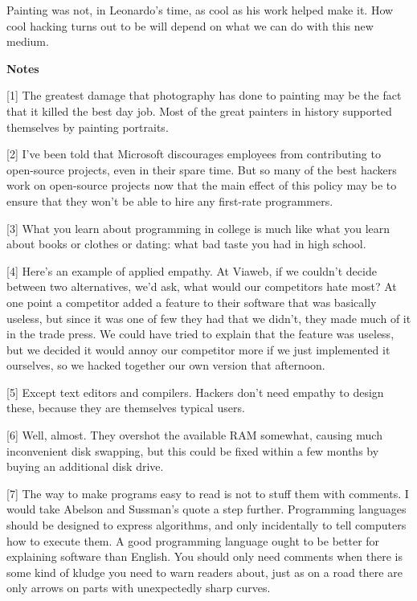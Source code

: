 Painting was not, in Leonardo's time, as cool as his work
helped make it.
How cool hacking turns out to be will depend on what we can
do with this new medium.  






\textbf{Notes}

[1] The greatest damage that photography has done
to painting may be the fact that it killed the best day job.
Most of the great painters in history supported
themselves by painting portraits.  

[2] I've been told that Microsoft discourages
employees from contributing to open-source projects, even in
their spare time.
But so many of the best hackers work on open-source
projects now that the main effect of this policy may be
to ensure that they won't be able to hire any first-rate
programmers.

[3] What you learn about programming in college is much like
what you learn about books or clothes or dating: what bad taste you
had in high school.

[4] Here's an example of applied empathy.
At Viaweb, if we couldn't decide between two alternatives, we'd
ask, what would our competitors hate most?  At one point a
competitor added a feature to their software that was basically
useless, but since it was one of few they had that we didn't, they
made much of it in the trade press.
We could have tried to explain that the feature was useless,
but we decided it would annoy our competitor more if we
just implemented it ourselves, so we hacked together our own
version that afternoon.

[5] Except text editors and compilers.  Hackers don't need empathy to
design these, because they are themselves typical users.

[6] Well, almost.  They overshot the available RAM somewhat,
causing much inconvenient disk swapping, but this could be fixed
within a few months by buying an additional disk drive.

[7] The way to make programs easy to read is not to
stuff them with comments. I would take Abelson and Sussman's
quote a step further.  Programming languages should be designed
to express algorithms, and only incidentally to tell computers
how to execute them.  A good programming language
ought to be better for explaining software than English.
You should only
need comments when there is some kind of kludge you need to warn
readers about, just as on a road there are only
arrows on parts with unexpectedly sharp curves.


